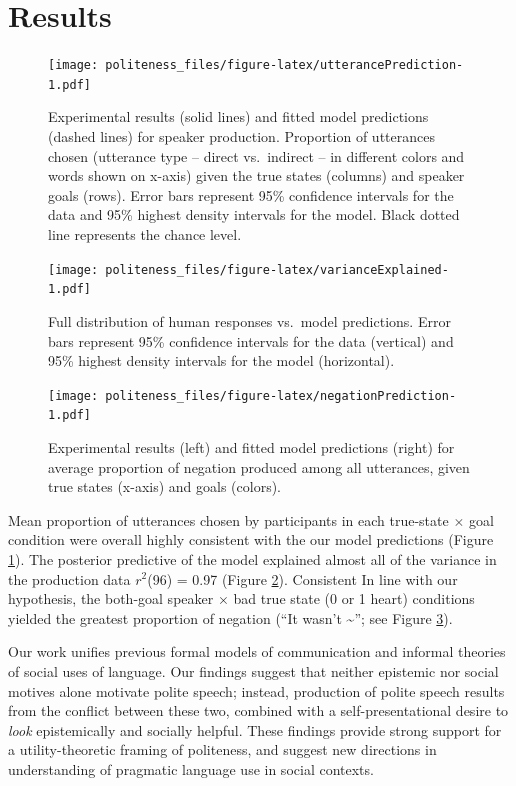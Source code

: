 \documentclass[english,floatsintext,man]{apa6}
\theoremstyle{definition}
\theoremstyle{definition}
\theoremstyle{definition}
\theoremstyle{remark}
\begin{document}
\hypertarget{results}{%
\section{Results}\label{results}}

\begin{figure}
\centering
\texttt{[image: politeness\_files/figure-latex/utterancePrediction-1.pdf]}
\caption{\label{fig:utterancePrediction}Experimental results (solid lines)
and fitted model predictions (dashed lines) for speaker production.
Proportion of utterances chosen (utterance type -- direct vs.~indirect
-- in different colors and words shown on x-axis) given the true states
(columns) and speaker goals (rows). Error bars represent 95\% confidence
intervals for the data and 95\% highest density intervals for the model.
Black dotted line represents the chance level.}
\end{figure}

\begin{figure}
\centering
\texttt{[image: politeness\_files/figure-latex/varianceExplained-1.pdf]}
\caption{\label{fig:varianceExplained}Full distribution of human responses
vs.~model predictions. Error bars represent 95\% confidence intervals
for the data (vertical) and 95\% highest density intervals for the model
(horizontal).}
\end{figure}

\begin{figure}
\centering
\texttt{[image: politeness\_files/figure-latex/negationPrediction-1.pdf]}
\caption{\label{fig:negationPrediction}Experimental results (left) and
fitted model predictions (right) for average proportion of negation
produced among all utterances, given true states (x-axis) and goals
(colors).}
\end{figure}

Mean proportion of utterances chosen by participants in each true-state
\(\times\) goal condition were overall highly consistent with the our
model predictions (Figure \ref{fig:utterancePrediction}). The posterior
predictive of the model explained almost all of the variance in the
production data \(r^2\)(96) = 0.97 (Figure \ref{fig:varianceExplained}).
Consistent In line with our hypothesis, the both-goal speaker \(\times\)
bad true state (0 or 1 heart) conditions yielded the greatest proportion
of negation (\enquote{It wasn't \textasciitilde{}}; see Figure
\ref{fig:negationPrediction}).

Our work unifies previous formal models of communication and informal
theories of social uses of language. Our findings suggest that neither
epistemic nor social motives alone motivate polite speech; instead,
production of polite speech results from the conflict between these two,
combined with a self-presentational desire to \emph{look} epistemically
and socially helpful. These findings provide strong support for a
utility-theoretic framing of politeness, and suggest new directions in
understanding of pragmatic language use in social contexts.
\end{document}
